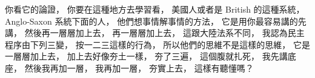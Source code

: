 \hypertarget{w06:cue:1402}{}你看它的論證，
\hypertarget{w06:cue:1403}{}你要在這種地方去學習看，
\hypertarget{w06:cue:1404}{}美國人或者是 British 的這種系統，
\hypertarget{w06:cue:1405}{}Anglo-Saxon 系統下面的人，
\hypertarget{w06:cue:1406}{}他們想事情解事情的方法，
\hypertarget{w06:cue:1407}{}它是用你最容易講的先講，
\hypertarget{w06:cue:1408}{}然後再一層層加上去，
\hypertarget{w06:cue:1409}{}再一層層加上去，
\hypertarget{w06:cue:1410}{}這跟大陸法系不同，
\hypertarget{w06:cue:1411}{}我認為民主程序由下列三變，
\hypertarget{w06:cue:1412}{}按一二三這樣的行為，
\hypertarget{w06:cue:1413}{}所以他們的思維不是這樣的思維，
\hypertarget{w06:cue:1414}{}它是一層層加上去，
\hypertarget{w06:cue:1415}{}加上去好像夯土一樣，
\hypertarget{w06:cue:1416}{}夯了三遍，
\hypertarget{w06:cue:1417}{}這個腹就扎死，
\hypertarget{w06:cue:1418}{}我先講底座，
\hypertarget{w06:cue:1419}{}然後我再加一層，
\hypertarget{w06:cue:1420}{}我再加一層，
\hypertarget{w06:cue:1421}{}夯實上去，
\hypertarget{w06:cue:1422}{}這樣有聽懂嗎？

